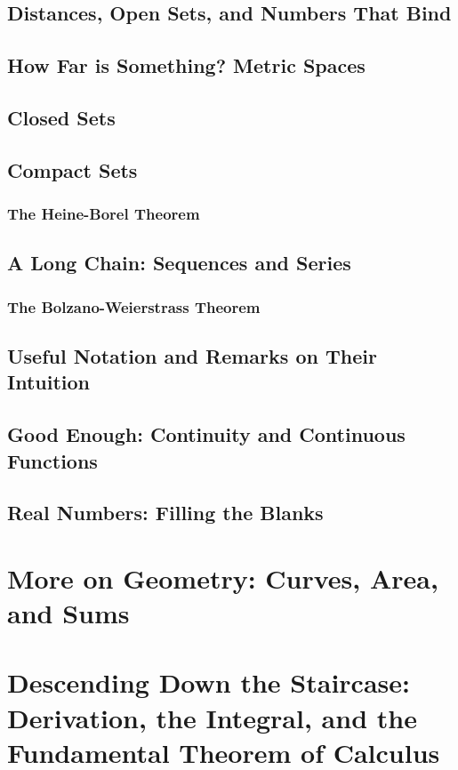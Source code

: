 \documentclass[openany]{book}
\newcommand{\secmark}{}
\newcommand{\marktotoc}[1]{\renewcommand{\secmark}{#1}}
\newenvironment{advanced}
{\renewcommand{\secmark}{\dag}
\addtocontents{toc}{\protect\marktotoc{\dag}}}
{\addtocontents{toc}{\protect\marktotoc{}}}
\begin{document}
\begin{advanced}
\section{Distances, Open Sets, and Numbers That Bind}
\section{How Far is Something? Metric Spaces}
\section{Closed Sets}
\section{Compact Sets}
\subsection{The Heine-Borel Theorem}
\section{A Long Chain: Sequences and Series}
\subsection{The Bolzano-Weierstrass Theorem}
\section{Useful Notation and Remarks on Their Intuition}
\section{Good Enough: Continuity and Continuous Functions}
\section{Real Numbers: Filling the Blanks}

\chapter{More on Geometry: Curves, Area, and Sums}

\chapter{Descending Down the Staircase: Derivation, the \mbox{Integral,} and the \mbox{Fundamental} Theorem of Calculus}

\end{advanced}
\end{document}
